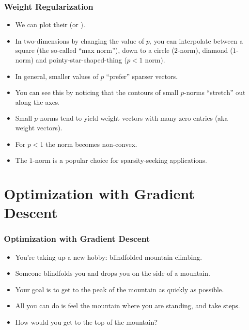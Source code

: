 \documentclass[trans]{beamer}
\begin{document}
\begin{frame}
  \frametitle{Weight Regularization}
\begin{itemize}
\item
We can plot their 
(or ).
\item In two-dimensions by changing the value of $p$, you can interpolate between a
square (the so-called ``max norm''), down to a circle ($2$-norm),
diamond ($1$-norm) and pointy-star-shaped-thing ($p<1$ norm).
\item
In general, smaller values of $p$ ``prefer'' sparser vectors.  
\item You can
see this by noticing that the contours of small $p$-norms ``stretch''
out along the axes.
\item Small $p$-norms tend
to yield weight vectors with many zero entries (aka 
weight vectors). 
\item For $p<1$ the norm becomes
non-convex.  
\item The $1$-norm is a
popular choice for sparsity-seeking applications.

\end{itemize}
\end{frame}
\section{Optimization with Gradient Descent}

\begin{frame}
  \frametitle{Optimization with Gradient Descent}
\begin{itemize}
\item
You're taking up a new hobby:
blindfolded mountain climbing.  
\item Someone blindfolds you and drops you
on the side of a mountain.  
\item Your goal is to get to the peak of the
mountain as quickly as possible. 
\item  All you can do is feel the mountain
where you are standing, and take steps. 
\item  How would you get to the top
of the mountain?  
\end{itemize}
\end{frame}
\end{document}
